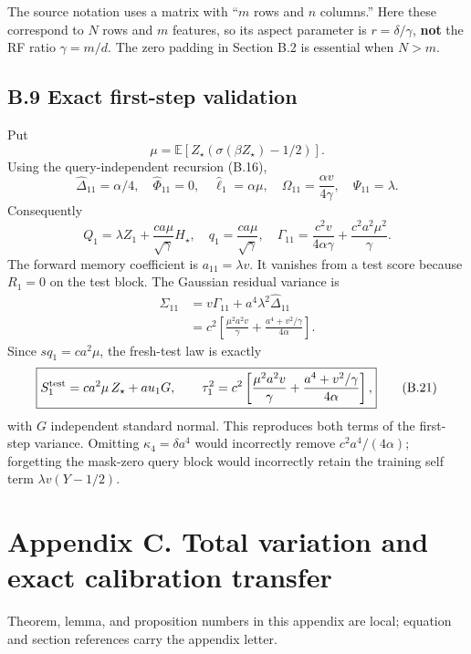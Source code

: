 \documentclass[
  11pt,
  a4paper,
]{article}
\begin{document}
The source notation uses a matrix with ``\(m\) rows and \(n\) columns.''
Here these correspond to \(N\) rows and \(m\) features, so its aspect
parameter is \(r=\delta/\gamma\), \textbf{not} the RF ratio
\(\gamma=m/d\). The zero padding in Section B.2 is essential when
\(N>m\).

\hypertarget{b.9-exact-first-step-validation}{%
\subsection{B.9 Exact first-step
validation}\label{b.9-exact-first-step-validation}}

Put \[
\mu=\mathbb E[Z_\star(\sigma(\beta Z_\star)-1/2)].
\] Using the query-independent recursion (B.16), \[
\widehat\Delta_{11}=\alpha/4,\quad \widehat\Phi_{11}=0,
\quad \widehat\ell_1=\alpha\mu,\quad
\Omega_{11}=\frac{\alpha v}{4\gamma},\quad \Psi_{11}=\lambda.
\] Consequently \[
Q_1=\lambda Z_1+\frac{ca\mu}{\sqrt\gamma}H_\star,
\quad q_1=\frac{ca\mu}{\sqrt\gamma},\quad
\Gamma_{11}=\frac{c^2v}{4\alpha\gamma}+\frac{c^2a^2\mu^2}{\gamma}.
\] The forward memory coefficient is \(a_{11}=\lambda v\). It vanishes
from a test score because \(R_1=0\) on the test block. The Gaussian
residual variance is \[
\begin{aligned}
\Sigma_{11}
&=v\Gamma_{11}+a^4\lambda^2\widehat\Delta_{11}\\
&=c^2\left[\frac{\mu^2a^2v}{\gamma}
+\frac{a^4+v^2/\gamma}{4\alpha}\right].
\end{aligned}
\] Since \(s q_1=ca^2\mu\), the fresh-test law is exactly \[
\boxed{S_1^{\rm test}=ca^2\mu\,Z_\star+ au_1G,\qquad
\tau_1^2=c^2\left[\frac{\mu^2a^2v}{\gamma}
+\frac{a^4+v^2/\gamma}{4\alpha}\right],}
\tag{B.21}
\] with \(G\) independent standard normal. This reproduces both terms of
the first-step variance. Omitting \(\kappa_4=\delta a^4\) would
incorrectly remove \(c^2a^4/(4\alpha)\); forgetting the mask-zero query
block would incorrectly retain the training self term
\(\lambda v(Y-1/2)\).

\clearpage

\hypertarget{appendix-c.-total-variation-and-exact-calibration-transfer}{%
\section{Appendix C. Total variation and exact calibration
transfer}\label{appendix-c.-total-variation-and-exact-calibration-transfer}}

Theorem, lemma, and proposition numbers in this appendix are local;
equation and section references carry the appendix letter.
\end{document}
